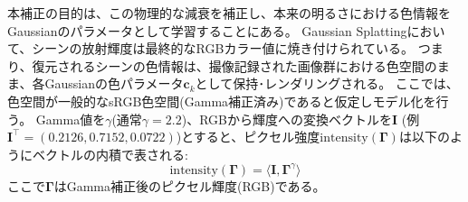 本補正の目的は、この物理的な減衰を補正し、本来の明るさにおける色情報をGaussianのパラメータとして学習することにある。
Gaussian Splattingにおいて、シーンの放射輝度は最終的なRGBカラー値に焼き付けられている。
つまり、復元されるシーンの色情報は、撮像記録された画像群における色空間のまま、各Gaussianの色パラメータ$\bm{c}_k$として保持･レンダリングされる。
ここでは、色空間が一般的なsRGB色空間(Gamma補正済み)であると仮定しモデル化を行う。
Gamma値を$\gamma$(通常$\gamma=2.2$)、RGBから輝度への変換ベクトルを$\mathbf{I}$ (例 $\mathbf{I}^\top = (0.2126, 0.7152, 0.0722)$)とすると、ピクセル強度$\mathrm{intensity}(\bm{\Gamma})$は以下のようにベクトルの内積で表される:
\begin{equation}
  \mathrm{intensity}(\bm{\Gamma}) = \langle\mathbf{I},\bm{\Gamma}^\gamma\rangle
\end{equation}
ここで$\bm{\Gamma}$はGamma補正後のピクセル輝度(RGB)である。

